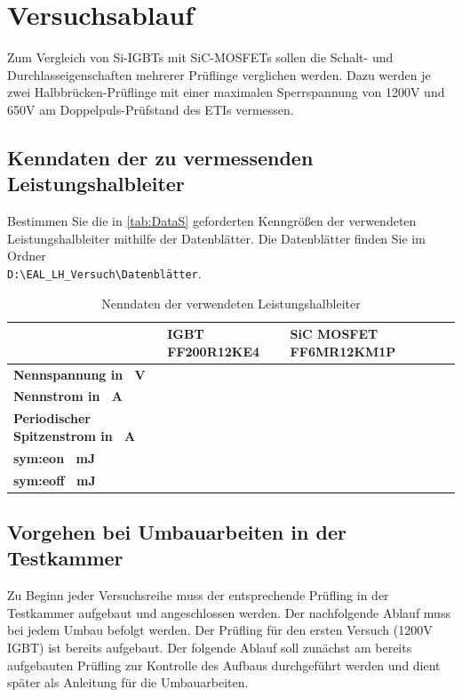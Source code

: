 
\chapter{Versuchsablauf}

Zum Vergleich von \gls{Si}-\gls{IGBT}s mit \gls{SiC}-\gls{MOSFET}s sollen die Schalt- und Durchlasseigenschaften 
mehrerer Prüflinge verglichen werden. Dazu werden je zwei Halbbrücken-Prüflinge mit einer maximalen 
Sperrspannung von 1200V und 650V am Doppelpuls-Prüfstand des \gls{ETI}s vermessen.
 
 
 \section{Kenndaten der zu vermessenden Leistungshalbleiter} \label{sec:datenblatt}
 
 Bestimmen Sie die in \autoref{tab:DataS} geforderten Kenngrößen der verwendeten Leistungshalbleiter mithilfe der Datenblätter. Die Datenblätter finden Sie im Ordner \\
\verb|D:\EAL_LH_Versuch\Datenblätter|\grqq{}. 
 
 \begin{table}[htb]
 	\centering
 	\caption{Nenndaten der verwendeten Leistungshalbleiter}
 	\label{tab:DataS}
 	\begin{tabular}{|C{0.18\textwidth}|C{0.25\textwidth}|C{0.25\textwidth}|C{0.25\textwidth}|}
 		\hline
 		 & \textbf{IGBT FF200R12KE4}  & \textbf{SiC MOSFET FF6MR12KM1P} \\
 		\hline
 		\textbf{Nennspannung in \SI{}{\volt}} &  &  \\
 		\hline
 		\textbf{Nennstrom in \SI{}{\ampere}} &  &  \\
 		\hline
 		\textbf{Periodischer Spitzenstrom in \SI{}{\ampere}} &  & \\
 		\hline
 		\textbf{\gls{sym:eon} \SI{}{\milli\joule}} &  &  \\
 		\hline
 		\textbf{\gls{sym:eoff} \SI{}{\milli\joule}} &  & \\
 		\hline
 	\end{tabular}
 \end{table}
 
 
 
\section{Vorgehen bei Umbauarbeiten in der Testkammer} \label{sec:aufbau1200}
\setlength{\aweboxvskip}{0mm}
Zu Beginn jeder Versuchsreihe muss der entsprechende Prüfling in der Testkammer aufgebaut und angeschlossen werden. Der nachfolgende Ablauf muss bei jedem Umbau befolgt werden. 
Der Prüfling für den ersten Versuch (1200V IGBT) ist bereits aufgebaut. Der folgende Ablauf soll zunächst am bereits aufgebauten Prüfling zur Kontrolle des Aufbaus durchgeführt werden und dient später als Anleitung für die Umbauarbeiten.

